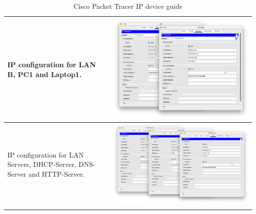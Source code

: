 \documentclass[11pt,a4paper]{report}
\begin{document}
\begin{flushleft}
\begin{center}
\begin{longtable}{ m{5cm} l }
                        IP configuration for LAN B, PC1 and Laptop1.                                                                                                                            & \includegraphics[scale=0.25 ,valign=c]{lanb-ipall}                    \\ \hline
                        IP configuration for LAN Servers, DHCP-Server, DNS-Server and HTTP-Server.                                                                                              & \includegraphics[scale=0.19 ,valign=c]{lanservers-ipall}              \\ \hline

                        \caption{Cisco Packet Tracer IP device guide}
                        \label{tab:cptg1}
                    \end{longtable}
                \end{center}
        \end{flushleft}
\end{document}
